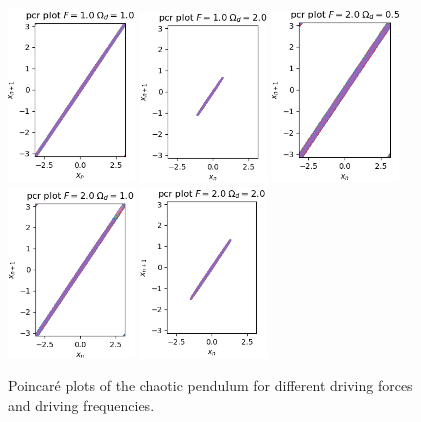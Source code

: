 \documentclass[11pt]{article} %
\begin{document}
\begin{figure}[H]
        \includegraphics[width=0.3\textwidth]{pcp_1.0_1.0.png}
        \includegraphics[width=0.3\textwidth]{pcp_1.0_2.0.png}
        \includegraphics[width=0.3\textwidth]{pcp_2.0_0.5.png}
        \includegraphics[width=0.3\textwidth]{pcp_2.0_1.0.png}
        \includegraphics[width=0.3\textwidth]{pcp_2.0_2.0.png}
        \caption{Poincar\'e plots of the chaotic pendulum for different driving forces and driving frequencies.}
    \end{figure}
\end{document}
